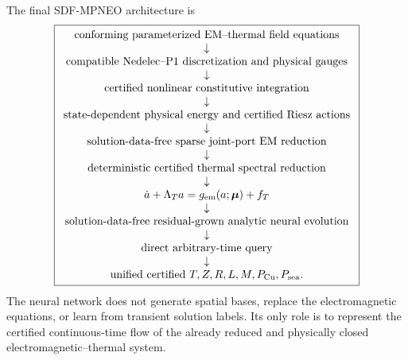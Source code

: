 \documentclass[11pt]{article}
\theoremstyle{remark}
\newcommand{\mupar}{\boldsymbol\mu}
\begin{document}
The final SDF-MPNEO architecture is
\[
\boxed{
\begin{array}{c}
\text{conforming parameterized EM--thermal field equations}\\
\downarrow\\
\text{compatible Nedelec--P1 discretization and physical gauges}\\
\downarrow\\
\text{certified nonlinear constitutive integration}\\
\downarrow\\
\text{state-dependent physical energy and certified Riesz actions}\\
\downarrow\\
\text{solution-data-free sparse joint-port EM reduction}\\
\downarrow\\
\text{deterministic certified thermal spectral reduction}\\
\downarrow\\
\dot a+\Lambda_Ta=g_{\rm em}(a;\mupar)+f_T\\
\downarrow\\
\text{solution-data-free residual-grown analytic neural evolution}\\
\downarrow\\
\text{direct arbitrary-time query}\\
\downarrow\\
\text{unified certified }T,Z,R,L,M,P_{\rm Cu},P_{\rm sea}.
\end{array}}
\]
The neural network does not generate spatial bases, replace the electromagnetic equations, or learn from transient solution labels. Its only role is to represent the certified continuous-time flow of the already reduced and physically closed electromagnetic--thermal system.
\end{document}
